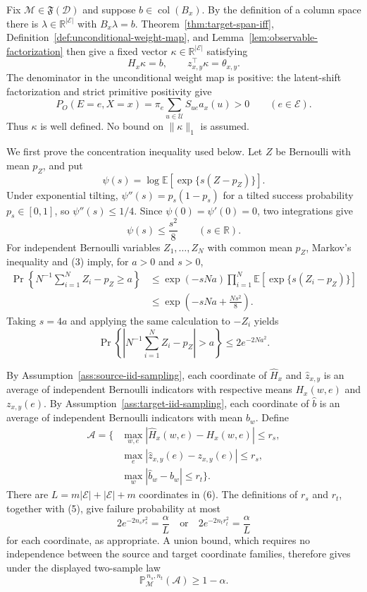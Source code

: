Fix \(\mathcal M\in\mathfrak F(\mathcal D)\) and suppose \(b\in\operatorname{col}(B_x)\). By the definition of a column space there is \(\lambda\in\mathbb R^{\lvert\mathcal E\rvert}\) with \(B_x\lambda=b\). Theorem~\ref{thm:target-span-iff}, Definition~\ref{def:unconditional-weight-map}, and Lemma~\ref{lem:observable-factorization} then give a fixed vector \(\kappa\in\mathbb R^{\lvert\mathcal E\rvert}\) satisfying
\[
H_x\kappa=b,
\qquad
z_{x,y}^{\top}\kappa=\theta_{x,y}.
\tag{1}
\]
The denominator in the unconditional weight map is positive: the latent-shift factorization and strict primitive positivity give
\[
P_O(E=e,X=x)=\pi_e\sum_{u\in\mathcal U}S_{ue}a_x(u)>0
\qquad(e\in\mathcal E).
\tag{2}
\]
Thus \(\kappa\) is well defined. No bound on \(\lVert\kappa\rVert_1\) is assumed.

We first prove the concentration inequality used below. Let \(Z\) be Bernoulli with mean \(p_Z\), and put
\[
\psi(s)=\log\mathbb E\!\left[\exp\{s(Z-p_Z)\}\right].
\]
Under exponential tilting, \(\psi''(s)=p_s(1-p_s)\) for a tilted success probability \(p_s\in[0,1]\), so \(\psi''(s)\le1/4\). Since \(\psi(0)=\psi'(0)=0\), two integrations give
\[
\psi(s)\le \frac{s^2}{8}
\qquad(s\in\mathbb R).
\tag{3}
\]
For independent Bernoulli variables \(Z_1,\ldots,Z_N\) with common mean \(p_Z\), Markov's inequality and (3) imply, for \(a>0\) and \(s>0\),
\[
\begin{aligned}
\Pr\!\left\{N^{-1}\sum_{i=1}^N Z_i-p_Z\ge a\right\}
&\le \exp(-sNa)\prod_{i=1}^N
 \mathbb E\!\left[\exp\{s(Z_i-p_Z)\}\right]\\
&\le \exp\!\left(-sNa+\frac{Ns^2}{8}\right).
\end{aligned}
\tag{4}
\]
Taking \(s=4a\) and applying the same calculation to \(-Z_i\) yields
\[
\Pr\!\left\{\left|N^{-1}\sum_{i=1}^N Z_i-p_Z\right|>a\right\}
\le 2e^{-2Na^2}.
\tag{5}
\]

By Assumption~\ref{ass:source-iid-sampling}, each coordinate of \(\widehat H_x\) and \(\widehat z_{x,y}\) is an average of independent Bernoulli indicators with respective means \(H_x(w,e)\) and \(z_{x,y}(e)\). By Assumption~\ref{ass:target-iid-sampling}, each coordinate of \(\widehat b\) is an average of independent Bernoulli indicators with mean \(b_w\). Define
\[
\begin{aligned}
\mathcal A=\{&\max_{w,e}|\widehat H_x(w,e)-H_x(w,e)|\le r_s,\\
&\max_e|\widehat z_{x,y}(e)-z_{x,y}(e)|\le r_s,\\
&\max_w|\widehat b_w-b_w|\le r_t\}.
\end{aligned}
\tag{6}
\]
There are \(L=m\lvert\mathcal E\rvert+\lvert\mathcal E\rvert+m\) coordinates in (6). The definitions of \(r_s\) and \(r_t\), together with (5), give failure probability at most
\[
2e^{-2n_s r_s^2}=\frac{\alpha}{L}
\quad\text{or}\quad
2e^{-2n_t r_t^2}=\frac{\alpha}{L}
\tag{7}
\]
for each coordinate, as appropriate. A union bound, which requires no independence between the source and target coordinate families, therefore gives under the displayed two-sample law
\[
\mathbb P_{\mathcal M}^{\,n_s,n_t}(\mathcal A)\ge1-\alpha.
\tag{8}
\]


